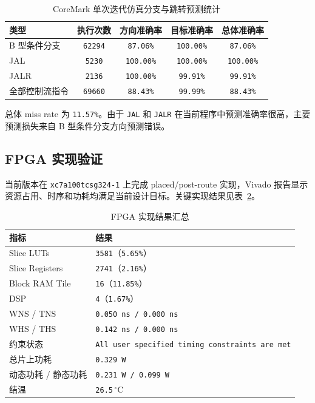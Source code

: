 ﻿\documentclass[12pt,a4paper]{ctexart}
\begin{document}
\begin{table}[H]
    \centering
    \caption{CoreMark 单次迭代仿真分支与跳转预测统计}
    \label{tab:validation_branch_stats}
    \begin{tabular}{lcccc}
        \toprule
        类型 & 执行次数 & 方向准确率 & 目标准确率 & 总体准确率 \\
        \midrule
        B 型条件分支 & \texttt{62294} & \texttt{87.06\%} & \texttt{100.00\%} & \texttt{87.06\%} \\
        JAL & \texttt{5230} & \texttt{100.00\%} & \texttt{100.00\%} & \texttt{100.00\%} \\
        JALR & \texttt{2136} & \texttt{100.00\%} & \texttt{99.91\%} & \texttt{99.91\%} \\
        \midrule
        全部控制流指令 & \texttt{69660} & \texttt{88.43\%} & \texttt{99.99\%} & \texttt{88.43\%} \\
        \bottomrule
    \end{tabular}
\end{table}

总体 miss rate 为 \texttt{11.57\%}。由于 \texttt{JAL} 和 \texttt{JALR} 在当前程序中预测准确率很高，主要预测损失来自 B 型条件分支方向预测错误。

\subsection{FPGA 实现验证}
当前版本在 \texttt{xc7a100tcsg324-1} 上完成 placed/post-route 实现，Vivado 报告显示资源占用、时序和功耗均满足当前设计目标。关键实现结果见表~\ref{tab:validation_impl_summary}。

\begin{table}[H]
    \centering
    \caption{FPGA 实现结果汇总}
    \label{tab:validation_impl_summary}
    \begin{tabularx}{\textwidth}{lX}
        \toprule
        指标 & 结果 \\
        \midrule
        Slice LUTs & \texttt{3581}（\texttt{5.65\%}） \\
        Slice Registers & \texttt{2741}（\texttt{2.16\%}） \\
        Block RAM Tile & \texttt{16}（\texttt{11.85\%}） \\
        DSP & \texttt{4}（\texttt{1.67\%}） \\
        WNS / TNS & \texttt{0.050 ns / 0.000 ns} \\
        WHS / THS & \texttt{0.142 ns / 0.000 ns} \\
        约束状态 & \texttt{All user specified timing constraints are met} \\
        总片上功耗 & \texttt{0.329 W} \\
        动态功耗 / 静态功耗 & \texttt{0.231 W / 0.099 W} \\
        结温 & \texttt{26.5}$\,^{\circ}\mathrm{C}$ \\
        \bottomrule
    \end{tabularx}
\end{table}
\end{document}
